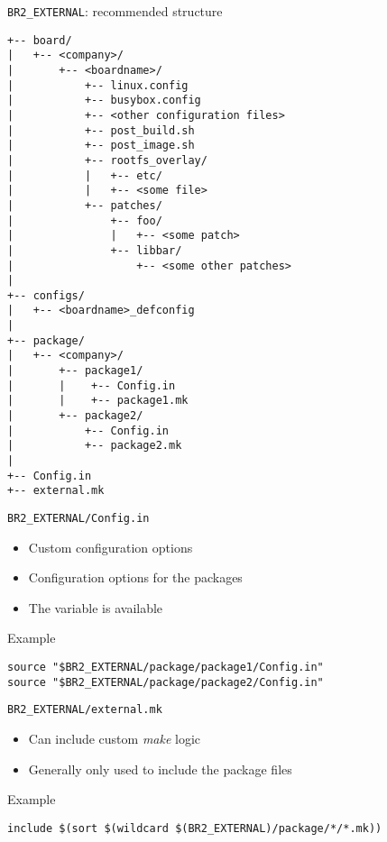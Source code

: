 \begin{frame}[fragile]{{\tt BR2\_EXTERNAL}: recommended structure}

  \begin{block}{}
    {\tiny
\begin{verbatim}
+-- board/
|   +-- <company>/
|       +-- <boardname>/
|           +-- linux.config
|           +-- busybox.config
|           +-- <other configuration files>
|           +-- post_build.sh
|           +-- post_image.sh
|           +-- rootfs_overlay/
|           |   +-- etc/
|           |   +-- <some file>
|           +-- patches/
|               +-- foo/
|               |   +-- <some patch>
|               +-- libbar/
|                   +-- <some other patches>
|
+-- configs/
|   +-- <boardname>_defconfig
|
+-- package/
|   +-- <company>/
|       +-- package1/
|       |    +-- Config.in
|       |    +-- package1.mk
|       +-- package2/
|           +-- Config.in
|           +-- package2.mk
|
+-- Config.in
+-- external.mk
\end{verbatim}
    }
  \end{block}

\end{frame}

\begin{frame}[fragile]{{\tt BR2\_EXTERNAL/Config.in}}

  \begin{itemize}
  \item Custom configuration options
  \item Configuration options for the  packages
  \item The  variable is available
  \end{itemize}

  \begin{block}{Example }
\begin{verbatim}
source "$BR2_EXTERNAL/package/package1/Config.in"
source "$BR2_EXTERNAL/package/package2/Config.in"
\end{verbatim}
  \end{block}

\end{frame}

\begin{frame}[fragile]{{\tt BR2\_EXTERNAL/external.mk}}

  \begin{itemize}
  \item Can include custom {\em make} logic
  \item Generally only used to include the package  files
  \end{itemize}

  \begin{block}{Example }
\begin{verbatim}
include $(sort $(wildcard $(BR2_EXTERNAL)/package/*/*.mk))
\end{verbatim}
  \end{block}
\end{frame}

